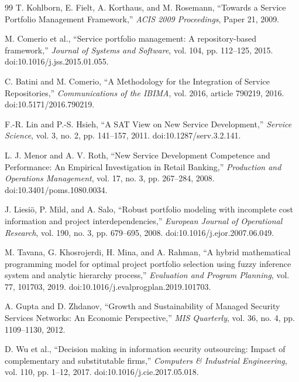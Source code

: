 \documentclass[systems,article,submit,moreauthors]{Definitions/mdpi}
\begin{document}
\begin{thebibliography}{99}
\fontsize{9}{10.5}\selectfont
{} T. Kohlborn, E. Fielt, A. Korthaus, and M. Rosemann, ``Towards a Service Portfolio Management Framework,'' \emph{ACIS 2009 Proceedings}, Paper 21, 2009.

 M. Comerio et al., ``Service portfolio management: A repository-based framework,'' \emph{Journal of Systems and Software}, vol. 104, pp. 112--125, 2015. doi:10.1016/j.jss.2015.01.055.

 C. Batini and M. Comerio, ``A Methodology for the Integration of Service Repositories,'' \emph{Communications of the IBIMA}, vol. 2016, article 790219, 2016. doi:10.5171/2016.790219.

 F.-R. Lin and P.-S. Hsieh, ``A SAT View on New Service Development,'' \emph{Service Science}, vol. 3, no. 2, pp. 141--157, 2011. doi:10.1287/serv.3.2.141.

 L. J. Menor and A. V. Roth, ``New Service Development Competence and Performance: An Empirical Investigation in Retail Banking,'' \emph{Production and Operations Management}, vol. 17, no. 3, pp. 267--284, 2008. doi:10.3401/poms.1080.0034.

 J. Liesi\"o, P. Mild, and A. Salo, ``Robust portfolio modeling with incomplete cost information and project interdependencies,'' \emph{European Journal of Operational Research}, vol. 190, no. 3, pp. 679--695, 2008. doi:10.1016/j.ejor.2007.06.049.

 M. Tavana, G. Khosrojerdi, H. Mina, and A. Rahman, ``A hybrid mathematical programming model for optimal project portfolio selection using fuzzy inference system and analytic hierarchy process,'' \emph{Evaluation and Program Planning}, vol. 77, 101703, 2019. doi:10.1016/j.evalprogplan.2019.101703.

 A. Gupta and D. Zhdanov, ``Growth and Sustainability of Managed Security Services Networks: An Economic Perspective,'' \emph{MIS Quarterly}, vol. 36, no. 4, pp. 1109--1130, 2012.

 D. Wu et al., ``Decision making in information security outsourcing: Impact of complementary and substitutable firms,'' \emph{Computers \& Industrial Engineering}, vol. 110, pp. 1--12, 2017. doi:10.1016/j.cie.2017.05.018.


\end{thebibliography}
\end{document}
